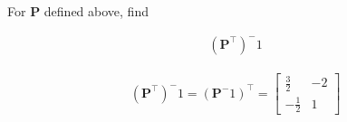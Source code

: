 For $\boldsymbol{P}$ defined above, find 

\begin{align*}
    \left(\boldsymbol{P}^\intercal\right)^-1
\end{align*}

\begin{solution}
    \begin{align*}
        \left(\boldsymbol{P}^\intercal\right)^-1 = \left(\boldsymbol{P}^-1\right)^\intercal = \begin{bmatrix}
            \frac{3}{2} & -2 \\
            - \frac{1}{2} & 1
        \end{bmatrix}
    \end{align*}
\end{solution}